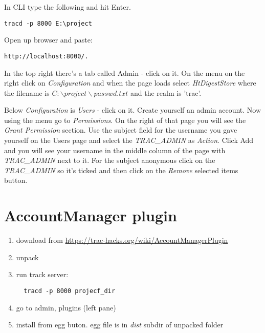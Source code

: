 \documentclass{report}
\begin{document}
In CLI type the following and hit Enter.
\begin{verbatim}
tracd -p 8000 E:\project
\end{verbatim}

Open up browser and paste:
\begin{verbatim}
http://localhost:8000/. 
\end{verbatim}

In the top right there's a tab called Admin - click on it. On the menu on the right
click on \textit{Configuration} and when the page loads select \textit{HtDigestStore}
where the filename is $C:\backslash project\backslash passwd.txt$ and the realm is 'trac'.

Below \textit{Configuration} is \textit{Users} - click on it. Create yourself 
an admin account. Now using the menu go to \textit{Permissions}. On the right 
of that page you will see the \textit{Grant Permission} section. Use the subject 
field for the username you gave yourself on the Users page and select the \textit{TRAC\_ADMIN} as
\textit{Action}. Click Add and you will see your username in the middle column of the page with 
\textit{TRAC\_ADMIN} next to it. For the subject anonymous click on the \textit{TRAC\_ADMIN} 
so it's ticked and then click on the \textit{Remove} selected items button.

\section{AccountManager plugin}
\begin{enumerate}
  \item download from \url{https://trac-hacks.org/wiki/AccountManagerPlugin}
  \item unpack
  \item run track server:
  \begin{verbatim}
  tracd -p 8000 projecf_dir
  \end{verbatim}
  \item go to admin, plugins (left pane)
  \item install from egg buton. egg file is in \textit{dist}
  subdir of unpacked folder
\end{enumerate}
\end{document}
